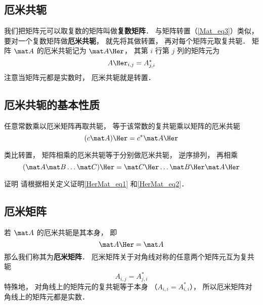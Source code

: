 

\subsection{厄米共轭}
我们把矩阵元可以取复数的矩阵叫做\textbf{复数矩阵}． %
与矩阵转置（\autoref{Mat_eq3}）类似， 要对一个复数矩阵做\textbf{厄米共轭}， 就先将其做转置， 再对每个矩阵元取复共轭． 矩阵 $\mat A$ 的厄米共轭记为 $\mat A\Her$， 其第 $i$ 行第 $j$ 列的矩阵元为
\begin{equation}
A\Her_{i,j} = A_{j,i}^*
\end{equation}
注意当矩阵元都是实数时， 厄米共轭就是转置．


\subsection{厄米共轭的基本性质}
任意常数乘以厄米矩阵再取共轭， 等于该常数的复共轭乘以矩阵的厄米共轭
\begin{equation}\label{HerMat_eq1}
(c \mat A)\Her = c^* \mat A\Her
\end{equation}

类比转置，%
矩阵相乘的厄米共轭等于分别做厄米共轭， 逆序排列， 再相乘
\begin{equation}\label{HerMat_eq2}
(\mat A \mat B \dots \mat C)\Her  = \mat C\Her \dots \mat B\Her \mat A\Her
\end{equation}

\begin{exercise}{证明}
请根据相关定义证明\autoref{HerMat_eq1} 和\autoref{HerMat_eq2}．
\end{exercise}

\subsection{厄米矩阵}
若 $\mat A$ 的厄米共轭是其本身， 即
\begin{equation}
\mat A\Her = \mat A
\end{equation}
那么我们称其为\textbf{厄米矩阵}． 厄米矩阵关于对角线对称的任意两个矩阵元互为复共轭
\begin{equation}
A_{i,j} = A_{j,i}^*
\end{equation}
特殊地， 对角线上的矩阵元的复共轭等于本身 （$A_{i,i} = A_{i,i}^*$）， 所以厄米矩阵对角线上的矩阵元都是实数．

